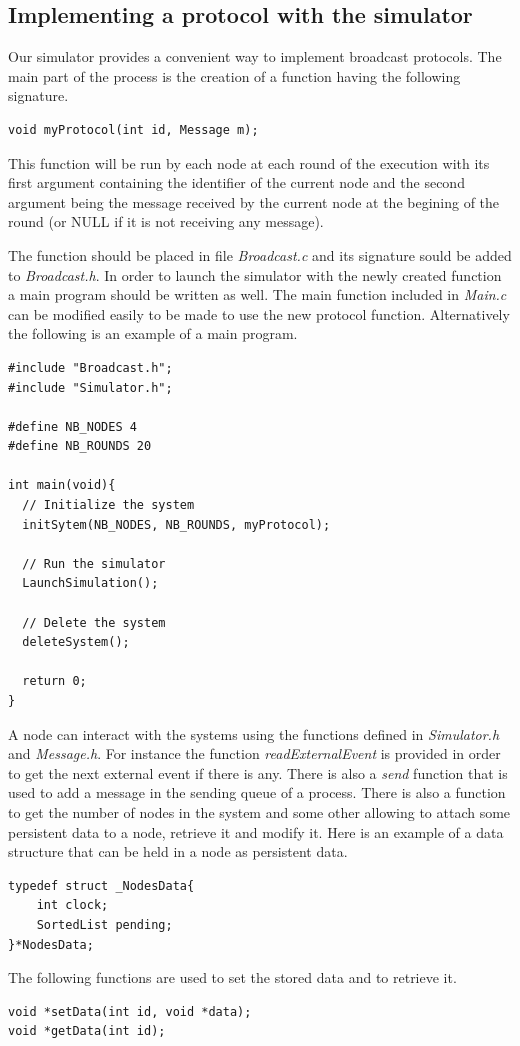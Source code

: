 \documentclass[a4paper]{article}
\begin{document}
\subsection{Implementing a protocol with the simulator}
Our simulator provides a convenient way to implement broadcast protocols. The
main part of the process is the creation of a function having the following
signature.
\begin{verbatim}
void myProtocol(int id, Message m);
\end{verbatim}

This function will be run by each node at each round of the execution with its
first argument containing the identifier of the current node and the second
argument being the message received by the current node at the begining of the
round (or NULL if it is not receiving any message).

The function should be placed in file \textit{Broadcast.c} and its signature
sould be added to \textit{Broadcast.h}. In order to launch the simulator with
the newly created function a main program should be written as well. The main
function included in \textit{Main.c} can be modified easily to be made to use
the new protocol function. Alternatively the following is an example of a
main program.

\begin{verbatim}
#include "Broadcast.h";
#include "Simulator.h";

#define NB_NODES 4
#define NB_ROUNDS 20

int main(void){
  // Initialize the system
  initSytem(NB_NODES, NB_ROUNDS, myProtocol);

  // Run the simulator
  LaunchSimulation();

  // Delete the system
  deleteSystem();

  return 0;
}
\end{verbatim}

A node can interact with the systems using the functions defined in
\textit{Simulator.h} and \textit{Message.h}. For instance the function
\textit{readExternalEvent} is provided in order to get the next external
event if there is any. There is also a \textit{send} function that is used to
add a message in the sending queue of a process. There is also a function
to get the number of nodes in the system and some other allowing to attach
some persistent data to a node, retrieve it and modify it. Here is an example
of a data structure that can be held in a node as persistent data.
\begin{verbatim}
typedef struct _NodesData{
    int clock;
    SortedList pending;
}*NodesData;
\end{verbatim}
The following functions are used to set the stored data and to retrieve it.
\begin{verbatim}
void *setData(int id, void *data);
void *getData(int id);
\end{verbatim}
\end{document}
